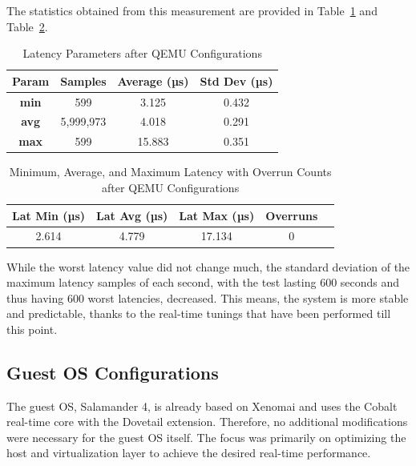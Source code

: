 \documentclass[MMR,Master,english]{twbook}
\begin{document}
\clearpage

\noindent The statistics obtained from this measurement are provided in Table~\ref{tab:latency_stats_virt_qemu} and Table~\ref{tab:latency_overrun_msw_new_virt_qemu}.

\begin{table}[H]
	\centering
	\caption{Latency Parameters after QEMU Configurations}
	\label{tab:latency_stats_virt_qemu}
	\begin{tabular}{|c|c|c|c|}
		\hline
		\textbf{Param} & \textbf{Samples} & \textbf{Average (µs)} & \textbf{Std Dev (µs)} \\ \hline
		\textbf{min}   & 599              & 3.125        & 0.432                 \\ \hline
		\textbf{avg}   & 5,999,973        & 4.018        & 0.291                 \\ \hline
		\textbf{max}   & 599              & 15.883       & 0.351                 \\ \hline
	\end{tabular}
\end{table}

\begin{table}[H]
	\centering
	\caption[Latency Statistics with Overrun Counts after QEMU Configurations]{Minimum, Average, and Maximum Latency with Overrun Counts after QEMU Configurations}
	\label{tab:latency_overrun_msw_new_virt_qemu}
	\begin{tabular}{|c|c|c|c|c|}
		\hline
		\textbf{Lat Min (µs)} & \textbf{Lat Avg (µs)} & \textbf{Lat Max (µs)} & \textbf{Overruns} \\ \hline
		2.614                 & 4.779                 & 17.134                & 0                 \\ \hline
	\end{tabular}
\end{table}

\noindent While the worst latency value did not change much, the standard deviation of the maximum latency samples of each second, with the test lasting 600 seconds and thus having 600 worst latencies, decreased. This means, the system is more stable and predictable, thanks to the real-time tunings that have been performed till this point.

\subsection{Guest OS Configurations}\label{subsec:guest_configurations}
The guest OS, Salamander 4, is already based on Xenomai and uses the Cobalt real-time core with the Dovetail extension. Therefore, no additional modifications were necessary for the guest OS itself. The focus was primarily on optimizing the host and virtualization layer to achieve the desired real-time performance.
\end{document}
